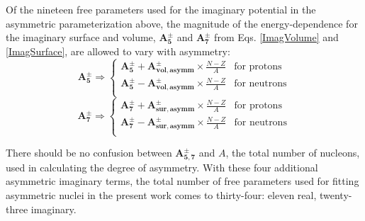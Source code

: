 \noindent
Of the nineteen free parameters used for the imaginary potential in the asymmetric parameterization
above, the magnitude of the energy-dependence for the imaginary surface and volume,
$\bm{A_{5}^{\pm}}$ and $\bm{A_{7}^{\pm}}$ from Eqs. \ref{ImagVolume} and \ref{ImagSurface},
are allowed to vary with asymmetry:
\begin{equation}
    \bm{A_{5}^{\pm}} \Rightarrow \begin{cases}
        \bm{A_{5}^{\pm}} + \bm{A_{vol, asymm}^{\pm}}\times\frac{N-Z}{A} & \text{for protons}\\
        \bm{A_{5}^{\pm}} - \bm{A_{vol, asymm}^{\pm}}\times\frac{N-Z}{A} & \text{for neutrons}\\
    \end{cases}
\end{equation}
\begin{equation}
    \bm{A_{7}^{\pm}} \Rightarrow \begin{cases}
        \bm{A_{7}^{\pm}} + \bm{A_{sur, asymm}^{\pm}}\times\frac{N-Z}{A} & \text{for protons}\\
        \bm{A_{7}^{\pm}} - \bm{A_{sur, asymm}^{\pm}}\times\frac{N-Z}{A} & \text{for neutrons}\\
    \end{cases}
\end{equation}

\noindent
There should be no confusion between $\bm{A_{5,7}^{\pm}}$ and $A$, the total number of nucleons, 
used in calculating the degree of asymmetry. With these four additional asymmetric imaginary terms,
the total number of free parameters used for
fitting asymmetric nuclei in the present work comes to thirty-four: eleven real, twenty-three
imaginary.


